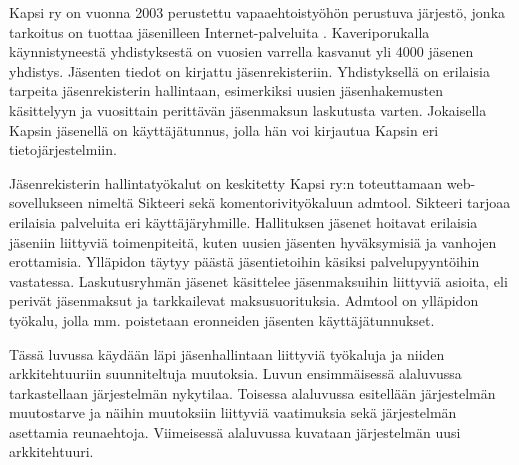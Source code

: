 Kapsi ry on vuonna 2003 perustettu vapaaehtoistyöhön perustuva järjestö, jonka tarkoitus on tuottaa jäsenilleen Internet-palveluita \cite{kapsifi}. Kaveriporukalla käynnistyneestä yhdistyksestä on vuosien varrella kasvanut yli 4000 jäsenen yhdistys. Jäsenten tiedot on kirjattu jäsenrekisteriin. Yhdistyksellä on erilaisia tarpeita jäsenrekisterin hallintaan, esimerkiksi uusien jäsenhakemusten käsittelyyn ja vuosittain perittävän jäsenmaksun laskutusta varten. Jokaisella Kapsin jäsenellä on käyttäjätunnus, jolla hän voi kirjautua Kapsin eri tietojärjestelmiin.

Jäsenrekisterin hallintatyökalut on keskitetty Kapsi ry:n toteuttamaan web-so\-vel\-luk\-seen nimeltä Sikteeri sekä komentorivityökaluun admtool. Sikteeri tarjoaa erilaisia palveluita eri käyttäjäryhmille. Hallituksen jäsenet hoitavat erilaisia jäseniin liittyviä toimenpiteitä, kuten uusien jäsenten hyväksymisiä ja vanhojen erottamisia. Ylläpidon täytyy päästä jäsentietoihin käsiksi palvelupyyntöihin vastatessa. Laskutusryhmän jäsenet käsittelee jäsenmaksuihin liittyviä asioita, eli perivät jäsenmaksut ja tarkkailevat maksusuorituksia. Admtool on ylläpidon työkalu, jolla mm. poistetaan eronneiden jäsenten käyttäjätunnukset.

Tässä luvussa käydään läpi jäsenhallintaan liittyviä työkaluja ja niiden arkkitehtuuriin suunniteltuja muutoksia. Luvun ensimmäisessä alaluvussa tarkastellaan järjestelmän nykytilaa. Toisessa alaluvussa esitellään järjestelmän muutostarve ja näihin muutoksiin liittyviä vaatimuksia sekä järjestelmän asettamia reunaehtoja. Viimeisessä alaluvussa kuvataan järjestelmän uusi arkkitehtuuri.